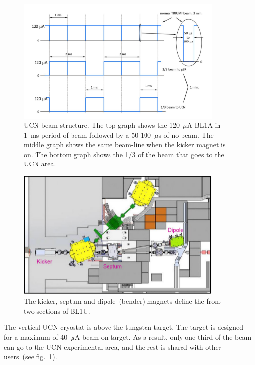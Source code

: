 \begin{figure}[h!]
  \centering
  \includegraphics[width=0.9\textwidth]{bl1u.png}
  \caption[UCN beam structure]{UCN beam structure. The top graph shows
    the 120~$\mu$A BL1A in 1~ms period of beam followed by a
    50-100~$\mu$s of no beam. The middle graph shows the same
    beam-line when the kicker magnet is on. The bottom graph shows the
    1/3 of the beam that goes to the UCN area.}
  \label{fig:bl1u}
\end{figure}



\begin{figure}[h!]
  \centering
  \includegraphics[width=0.9\textwidth]{magnets.png}
  \caption[The kicker, septum and dipole magnets]{The kicker, septum
    and dipole~(bender) magnets define the front two sections of
    BL1U.}
  \label{fig:magnets}
\end{figure}
The vertical UCN cryostat is above the tungsten target. The target is
designed for a maximum of 40~$\mu$A beam on target. As a result, only
one third of the beam can go to the UCN experimental area, and the
rest is shared with other users~(see fig.~\ref{fig:bl1u}).



